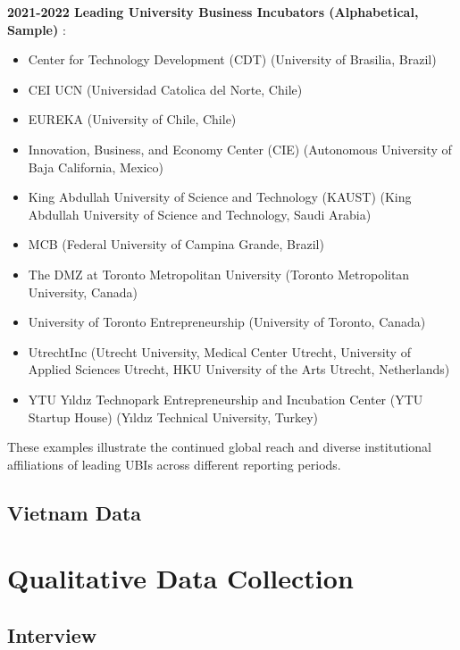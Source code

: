 \documentclass[../Main.tex]{subfiles}
\begin{document}
	\textbf{2021-2022 Leading University Business Incubators (Alphabetical, Sample)} \cite{ubi2021world}:
	\begin{itemize}
		\item Center for Technology Development (CDT) (University of Brasilia, Brazil)
		\item CEI UCN (Universidad Catolica del Norte, Chile)
		\item EUREKA (University of Chile, Chile)
		\item Innovation, Business, and Economy Center (CIE) (Autonomous University of Baja California, Mexico)
		\item King Abdullah University of Science and Technology (KAUST) (King Abdullah University of Science and Technology, Saudi Arabia)
		\item MCB (Federal University of Campina Grande, Brazil)
		\item The DMZ at Toronto Metropolitan University (Toronto Metropolitan University, Canada)
		\item University of Toronto Entrepreneurship (University of Toronto, Canada)
		\item UtrechtInc (Utrecht University, Medical Center Utrecht, University of Applied Sciences Utrecht, HKU University of the Arts Utrecht, Netherlands)
		\item YTU Yıldız Technopark Entrepreneurship and Incubation Center (YTU Startup House) (Yıldız Technical University, Turkey)
	\end{itemize}
	These examples illustrate the continued global reach and diverse institutional affiliations of leading UBIs across different reporting periods.
	
	\subsection{Vietnam Data}
	\section{Qualitative Data Collection}
	\subsection{Interview}
\end{document}
